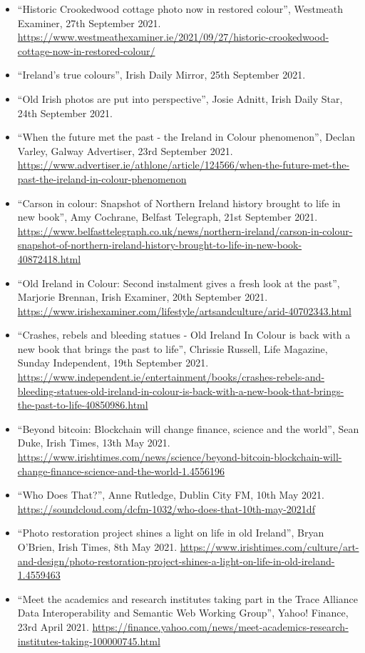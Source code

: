 \documentclass[10pt,a4paper]{res} %
\begin{document}
\begin{resume}
{\begin{itemize}
\item ``Historic Crookedwood cottage photo now in restored colour'', Westmeath Examiner, 27th September 2021. \url{https://www.westmeathexaminer.ie/2021/09/27/historic-crookedwood-cottage-now-in-restored-colour/}
\item ``Ireland's true colours'', Irish Daily Mirror, 25th September 2021.
\item ``Old Irish photos are put into perspective'', Josie Adnitt, Irish Daily Star, 24th September 2021.
\item ``When the future met the past - the Ireland in Colour phenomenon'', Declan Varley, Galway Advertiser, 23rd September 2021. \url{https://www.advertiser.ie/athlone/article/124566/when-the-future-met-the-past-the-ireland-in-colour-phenomenon}
\item ``Carson in colour: Snapshot of Northern Ireland history brought to life in new book'', Amy Cochrane, Belfast Telegraph, 21st September 2021. \url{https://www.belfasttelegraph.co.uk/news/northern-ireland/carson-in-colour-snapshot-of-northern-ireland-history-brought-to-life-in-new-book-40872418.html}
\item ``Old Ireland in Colour: Second instalment gives a fresh look at the past'', Marjorie Brennan, Irish Examiner, 20th September 2021. \url{https://www.irishexaminer.com/lifestyle/artsandculture/arid-40702343.html}
\item ``Crashes, rebels and bleeding statues - Old Ireland In Colour is back with a new book that brings the past to life'', Chrissie Russell, Life Magazine, Sunday Independent, 19th September 2021. \url{https://www.independent.ie/entertainment/books/crashes-rebels-and-bleeding-statues-old-ireland-in-colour-is-back-with-a-new-book-that-brings-the-past-to-life-40850986.html}
\item ``Beyond bitcoin: Blockchain will change finance, science and the world'', Sean Duke, Irish Times, 13th May 2021. \url{https://www.irishtimes.com/news/science/beyond-bitcoin-blockchain-will-change-finance-science-and-the-world-1.4556196}
\item ``Who Does That?'', Anne Rutledge, Dublin City FM, 10th May 2021. \url{https://soundcloud.com/dcfm-1032/who-does-that-10th-may-2021df}
\item ``Photo restoration project shines a light on life in old Ireland'', Bryan O'Brien, Irish Times, 8th May 2021. \url{https://www.irishtimes.com/culture/art-and-design/photo-restoration-project-shines-a-light-on-life-in-old-ireland-1.4559463}
\item ``Meet the academics and research institutes taking part in the Trace Alliance Data Interoperability and Semantic Web Working Group'', Yahoo! Finance, 23rd April 2021. \url{https://finance.yahoo.com/news/meet-academics-research-institutes-taking-100000745.html}

\end{itemize}}
\end{resume}
\end{document}
